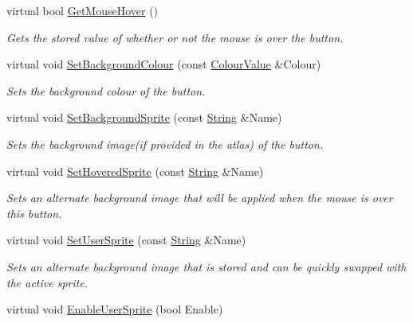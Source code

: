 \begin{DoxyCompactItemize}
virtual bool \hyperlink{classphys_1_1UI_1_1Button_a66522ebf5f3c75e96a6dfd99700a0f74}{GetMouseHover} ()
\begin{DoxyCompactList}\small\item\em Gets the stored value of whether or not the mouse is over the button. \item\end{DoxyCompactList}\item 
virtual void \hyperlink{classphys_1_1UI_1_1Button_a390aa5a409361507b5802141380bc1d3}{SetBackgroundColour} (const \hyperlink{classphys_1_1ColourValue}{ColourValue} \&Colour)
\begin{DoxyCompactList}\small\item\em Sets the background colour of the button. \item\end{DoxyCompactList}\item 
virtual void \hyperlink{classphys_1_1UI_1_1Button_a7cecb219a59fb55db6ac0070359bb23f}{SetBackgroundSprite} (const \hyperlink{namespacephys_aa03900411993de7fbfec4789bc1d392e}{String} \&Name)
\begin{DoxyCompactList}\small\item\em Sets the background image(if provided in the atlas) of the button. \item\end{DoxyCompactList}\item 
virtual void \hyperlink{classphys_1_1UI_1_1Button_a12cfac0dcc6324694f29968c0ca25d03}{SetHoveredSprite} (const \hyperlink{namespacephys_aa03900411993de7fbfec4789bc1d392e}{String} \&Name)
\begin{DoxyCompactList}\small\item\em Sets an alternate background image that will be applied when the mouse is over this button. \item\end{DoxyCompactList}\item 
virtual void \hyperlink{classphys_1_1UI_1_1Button_a8c3a5657daf79a882f71691e91785d4d}{SetUserSprite} (const \hyperlink{namespacephys_aa03900411993de7fbfec4789bc1d392e}{String} \&Name)
\begin{DoxyCompactList}\small\item\em Sets an alternate background image that is stored and can be quickly swapped with the active sprite. \item\end{DoxyCompactList}\item 
virtual void \hyperlink{classphys_1_1UI_1_1Button_a4fe6560484f1d78b08c96eaf967404d2}{EnableUserSprite} (bool Enable)

\end{DoxyCompactItemize}
